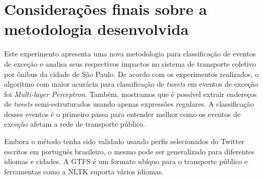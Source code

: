 \documentclass[
	12pt,				%
	oneside,			%
	a4paper,			%
	english,			%
	brazil				%
	]{abntex2ppgsi}
\begin{document}
{{\section{Considerações finais sobre a metodologia desenvolvida}

Este experimento apresenta uma nova metodologia para classificação de eventos de exceção e analisa seus respectivos impactos no sistema de transporte coletivo por ônibus da cidade de São Paulo. De acordo com os experimentos realizados, o algoritmo com maior  acurácia para classificação de \textit{tweets} em eventos de exceção foi \textit{Multi-layer Perceptron}. Também, mostramos que é possível extrair endereços de \textit{tweets} semi-estruturados usando apenas expressões regulares. A classificação desses eventos é o primeiro passo para entender melhor como os eventos de exceção afetam a rede de transporte público.

Embora o método tenha sido validado usando perfis selecionados do Twitter escritos em português brasileiro, o mesmo pode ser generalizado para diferentes idiomas e cidades. A GTFS é um formato ubíquo para o transporte público e ferramentas como a NLTK suporta vários idiomas.




}}
\end{document}
